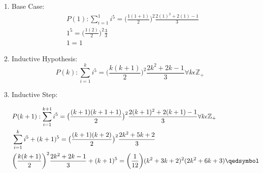 \documentclass[12pt]{article}
\begin{document}
\begin{enumerate}
\item Base Case:\\
\begin{align}
&P(1):\sum\limits_{i = 1}^{1} i^5 = \big(\frac{1(1 + 1)}{2}\big)^2\frac{2(1)^2+2(1)-1}{3}\\
&1^5 = \big(\frac{1(2)}{2}\big)^2\frac{3}{3}\\
&1 = 1
\end{align}
\item Inductive Hypothesis:
\[P(k):\sum\limits_{i = 1}^{k} i^5 = \big(\frac{k(k + 1)}{2}\big)^2\frac{2k^2+2k-1}{3} \forall k \epsilon \mathbb{Z}_+  \]
\item Inductive Step:

\begin{align}
&P(k+1):\sum\limits_{i = 1}^{k+1} i^5 = \big(\frac{(k+1)(k + 1 + 1)}{2}\big)^2\frac{2(k+1)^2+2(k+1)-1}{3} \forall k \epsilon \mathbb{Z}_+ \\
&\sum\limits_{i = 1}^{k} i^5 + (k + 1)^5 = \big(\frac{(k+1)(k + 2)}{2}\big)^2\frac{2k^2+5k+2}{3}\\
&\bigg(\frac{k(k + 1)}{2}\bigg)^2\frac{2k^2+2k-1}{3} + (k + 1)^5 = \bigg(\frac{1}{12}\bigg)(k^2+3k+2)^2(2k^2+6k+3)
\qedsymbol
\end{align}
\end{enumerate}
\end{document}

